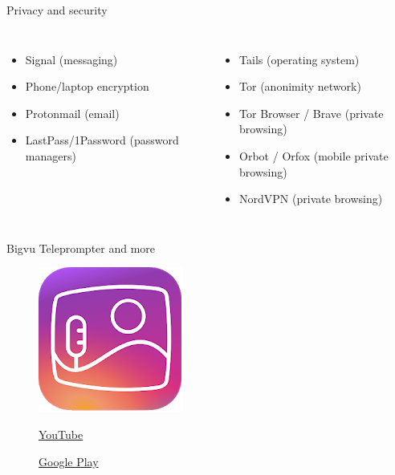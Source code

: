 \documentclass[serif,14pt,color=usenames,dvipsnames]{beamer}
\begin{document}
\begin{frame}{Privacy and security}
  \small
  \begin{columns}
    \begin{itemize}
      \item Signal (messaging)
      \item Phone/laptop encryption
      \item Protonmail (email)
      \item LastPass/1Password (password managers)
    \end{itemize}
    \begin{itemize}
      \item Tails (operating system)
      \item Tor (anonimity network)
      \item Tor Browser / Brave (private browsing)
      \item Orbot / Orfox (mobile private browsing)
      \item NordVPN (private browsing)
    \end{itemize}
  \end{columns}

\end{frame}

\begin{frame}{Bigvu}
  Teleprompter and more
  \begin{figure}
    \centering
  \includegraphics[width=0.3\linewidth]{imgs/bigvu}


  \href{https://www.youtube.com/watch?time_continue=2&v=-yqQnW5s70E}{YouTube }

  \href{https://play.google.com/store/apps/details?id=bigvu.com.reporter}{Google
  Play }
  \end{figure}
\end{frame}
\end{document}

